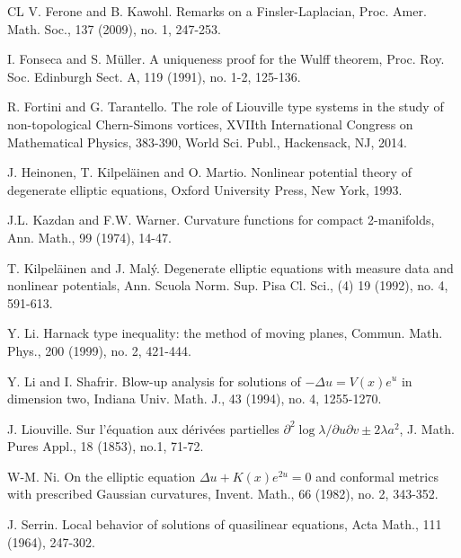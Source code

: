 \documentclass[11pt]{amsart}
\numberwithin{equation}{section}
\begin{document}
\begin{thebibliography}{CL}
 V. Ferone and B. Kawohl. Remarks on a Finsler-Laplacian, Proc. Amer. Math. Soc., 137 (2009), no. 1, 247-253.

 I. Fonseca and S. M\"{u}ller. A uniqueness proof for the Wulff theorem, Proc. Roy. Soc. Edinburgh Sect. A, 119 (1991), no. 1-2, 125-136.

 R. Fortini and G. Tarantello. The role of Liouville type systems in the study of non-topological Chern-Simons vortices, XVIIth International Congress on Mathematical Physics, 383-390, World Sci. Publ., Hackensack, NJ, 2014.

 J. Heinonen, T. Kilpel\"{a}inen and O. Martio. Nonlinear potential theory of degenerate elliptic equations, Oxford University Press, New York, 1993.



 J.L. Kazdan and F.W. Warner. Curvature functions for compact 2-manifolds, Ann.  Math., 99 (1974), 14-47.

 T. Kilpel\"{a}inen and J. Mal\'{y}. Degenerate elliptic equations with measure data and nonlinear potentials, Ann. Scuola Norm. Sup. Pisa Cl. Sci., (4) 19 (1992), no. 4, 591-613.

 Y. Li. Harnack type inequality: the method of moving planes, Commun. Math. Phys., 200 (1999), no. 2, 421-444.

 Y. Li and I. Shafrir. Blow-up analysis for solutions of $-\Delta u=V(x)e^{u}$ in dimension two, Indiana Univ. Math. J., 43 (1994), no. 4, 1255-1270.

 J. Liouville. Sur l'\'{e}quation aux d\'{e}riv\'{e}es partielles $\partial^{2}\log\lambda/\partial u\partial v\pm2\lambda a^{2}$, J. Math. Pures Appl., 18 (1853), no.1, 71-72.

 W-M. Ni. On the elliptic equation $\Delta u+K(x)e^{2u}=0$ and conformal metrics with prescribed Gaussian curvatures, Invent. Math., 66 (1982), no. 2, 343-352.

 J. Serrin. Local behavior of solutions of quasilinear equations, Acta Math., 111 (1964), 247-302.


\end{thebibliography}
\end{document}
